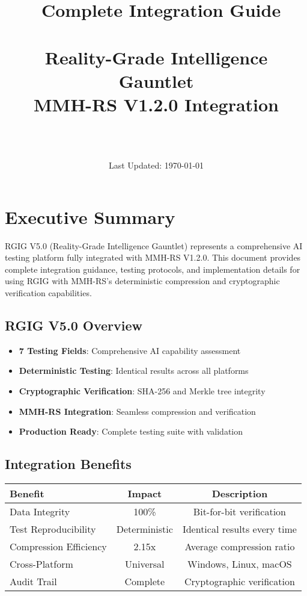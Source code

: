 \documentclass[12pt,a4paper]{article}
\title{\Huge\textbf{\project\ Complete Integration Guide}\\[0.5cm]
\Large\textbf{\version}\\[0.3cm]
\large Reality-Grade Intelligence Gauntlet\\[0.5cm]
\large MMH-RS V1.2.0 Integration}
\author{\Large\authorname\\[0.2cm]\email\\[0.2cm]\github}
\date{\large Last Updated: \today}
\begin{document}
\maketitle
\thispagestyle{empty}

\tableofcontents
\newpage

\section{Executive Summary}

RGIG V5.0 (Reality-Grade Intelligence Gauntlet) represents a comprehensive AI testing platform fully integrated with MMH-RS V1.2.0. This document provides complete integration guidance, testing protocols, and implementation details for using RGIG with MMH-RS's deterministic compression and cryptographic verification capabilities.

\subsection{RGIG V5.0 Overview}
\begin{itemize}
    \item \textbf{7 Testing Fields}: Comprehensive AI capability assessment
    \item \textbf{Deterministic Testing}: Identical results across all platforms
    \item \textbf{Cryptographic Verification}: SHA-256 and Merkle tree integrity
    \item \textbf{MMH-RS Integration}: Seamless compression and verification
    \item \textbf{Production Ready}: Complete testing suite with validation
\end{itemize}

\subsection{Integration Benefits}
\begin{center}
\begin{tabular}{|l|c|c|}
\hline
\textbf{Benefit} & \textbf{Impact} & \textbf{Description} \\
\hline
Data Integrity & 100\% & Bit-for-bit verification \\
Test Reproducibility & Deterministic & Identical results every time \\
Compression Efficiency & 2.15x & Average compression ratio \\
Cross-Platform & Universal & Windows, Linux, macOS \\
Audit Trail & Complete & Cryptographic verification \\
\hline
\end{tabular}
\end{center}
\end{document}
